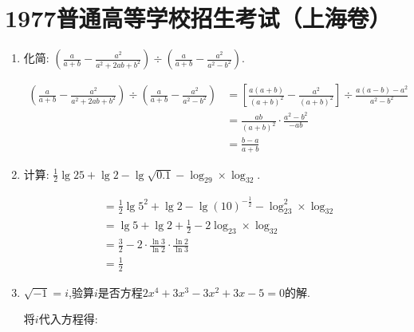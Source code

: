 \section*{1977普通高等学校招生考试（上海卷）}

\begin{questions}
	\question
	\begin{enumerate}[label=(\arabic*)]
		\item 化简:
		      \begin{math} \displaystyle
			      \left(\frac{a}{a+b} - \frac{a^2}{a^2 + 2ab + b^2}\right) \div \left(\frac{a}{a+b} - \frac{a^2}{a^2 - b^2}\right)
		      \end{math}.
		      \begin{solution}
			      \begin{align*}
				      \left(\frac{a}{a+b} - \frac{a^2}{a^2 + 2ab + b^2}\right) \div \left(\frac{a}{a+b} - \frac{a^2}{a^2 - b^2}\right)
				       & = \left[ \frac{a(a+b)}{(a+b)^2} - \frac{a^2}{(a+b)^2} \right] \div \frac{a(a-b) - a^2}{a^2-b^2}
				      \\
				       & = \frac{ab}{(a+b)^2} \cdot \frac{a^2 - b^2}{-ab}                                                \\
				       & = \frac{b-a}{a+b}
			      \end{align*}
		      \end{solution}
		\item 计算:
		      \begin{math}
			      \displaystyle
			      \frac12\lg25+\lg2 - \lg\sqrt{0.1} - \log_29 \times \log_32.
		      \end{math}
		      \begin{solution}
			      \begin{align*}
				       & = \frac12\lg5^2 + \lg2 - \lg(10)^{-\frac12} - \log_23^2 \times \log_32 \\
				       & = \lg5 + \lg2 + \frac12 - 2 \log_23 \times \log_32                     \\
				       & = \frac32 - 2 \cdot \frac{\ln3}{\ln2}\cdot \frac{\ln2}{\ln3}           \\
				       & = \frac12
			      \end{align*}
		      \end{solution}
		\item $\sqrt{-1} = i$,验算$i$是否方程$2x^4 + 3x^3 - 3x^2 + 3x - 5 = 0$的解.
		      \begin{solution}
			      将$i$代入方程得:
			      \begin{align*}

\end{align*}
\end{solution}
\end{enumerate}
\end{questions}
